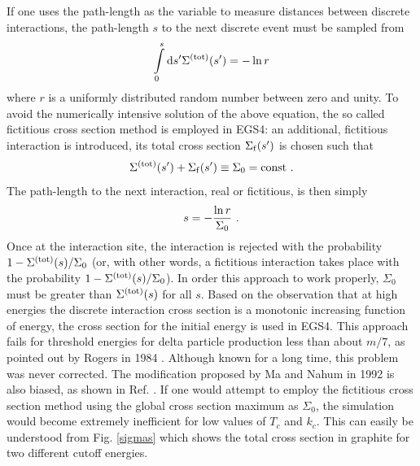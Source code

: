 If one uses the path-length as the variable to measure 
distances between discrete interactions, the path-length 
$s$ to the next discrete event must be sampled from 
\begin{equation}
\int\limits_0^s {\rm d} s' \Sigma^{\rm (tot)}(s') = -\ln r
\end{equation}
where $r$ is a uniformly distributed random number between 
zero and unity. To avoid the numerically intensive 
solution of the above equation, the so called 
fictitious cross section method is employed in EGS4: an additional,  
fictitious interaction is introduced, its total cross section 
$\Sigma_{\rm f}(s')$ is chosen such that 
\begin{equation}
\Sigma^{\rm (tot)}(s') + \Sigma_{\rm f}(s') \equiv \Sigma_0 = \text{const}~.
\end{equation} 
The path-length to the next interaction, real or fictitious, is then 
simply 
\begin{equation}
s = -{ \ln r \over \Sigma_0 }~.
\end{equation}
Once at the interaction site, the interaction is rejected with the 
probability $1 - \Sigma^{\rm (tot)}(s)/\Sigma_0$ (or, with other words, 
a fictitious interaction takes place with the probability 
$1 - \Sigma^{\rm (tot)}(s)/\Sigma_0$). In order this approach to work 
properly, $\Sigma_0$ must be greater than $\Sigma^{\rm (tot)}(s)$ for 
all $s$. Based on the observation that at high energies the 
discrete interaction cross section is a monotonic increasing function 
of energy, the cross section for the initial energy is used in EGS4. 
This approach fails for threshold energies for delta particle 
production less than about $m/7$, as pointed out by Rogers 
in 1984 \cite{Ro84}. Although known for a long time, this problem 
was never corrected. The modification proposed by Ma and Nahum 
in 1992 \cite{MN92} is also biased, as shown in Ref. \cite{Ka99a}. 
If one would attempt to employ the fictitious cross section method 
using the global cross section maximum as $\Sigma_0$, the 
simulation would become extremely inefficient for low values 
of $T_c$ and $k_c$. This can easily be understood from 
Fig. \ref{sigmas} which shows the total cross section in graphite  
for two different cutoff energies.
